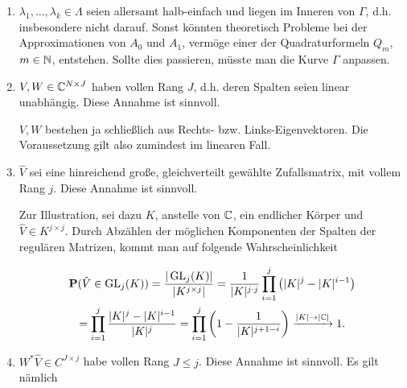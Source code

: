 \begin{enumerate}[label = \arabic*.]

    \item $\lambda_1, \dots, \lambda_k \in \Lambda$ seien allersamt halb-einfach und liegen im Inneren von $\Gamma$, d.h. insbesondere nicht darauf.
    Sonst könnten theoretisch Probleme bei der Approximationen von $A_0$ und $A_1$, vermöge einer der Quadraturformeln $Q_m$, $m \in \mathbb{N}$, entstehen.
    Sollte dies passieren, müsste man die Kurve $\Gamma$ anpassen.

    \item $V, W \in \mathbb{C}^{N \times J}$ haben vollen Rang $J$, d.h. deren Spalten seien linear unabhängig.
    Diese Annahme ist sinnvoll.

    $V, W$ bestehen ja schließlich aus Rechts- bzw. Links-Eigenvektoren.
    Die Voraussetzung gilt also zumindest im linearen Fall.
    
    \item $\hat V$ sei eine hinreichend große, gleichverteilt gewählte Zufallsmatrix, mit vollem Rang $j$.
    Diese Annahme ist sinnvoll.

    Zur Illustration, sei dazu $K$, anstelle von $\mathbb{C}$, ein endlicher Körper und $\hat V \in K^{j \times j}$.
    Durch Abzählen der möglichen Komponenten der Spalten der regulären Matrizen, kommt man auf folgende Wahrscheinlichkeit

    \begin{multline*}
        \mathbf{P}(\hat V \in \operatorname{GL}_j(K))
        =
        \frac
        {
            |\operatorname{GL}_j(K)|
        }{
            |K^{j \times j}|
        }
        =
        \frac{1}
        {
            |K|^{j \cdot j}
        }
        \prod_{i=1}^j
            {\left ( 
                |K|^j - |K|^{i-1}
             \right )} \\
        =
        \prod_{i=1}^j
            \frac
            {
                |K|^j - |K|^{i-1}
            }{
                |K|^j
            }
        =
        \prod_{i=1}^j
            {\left ( 
                1 - \frac{1}{|K|^{j + 1 - i}}
             \right )}
        \xrightarrow{|K| \to |\mathbb{C}|}
        1.
    \end{multline*}

    \item $W^\ast \hat V \in C^{J \times j}$ habe vollen Rang $J \leq j$.
    Diese Annahme ist sinnvoll.
    Es gilt nämlich


\end{enumerate}
